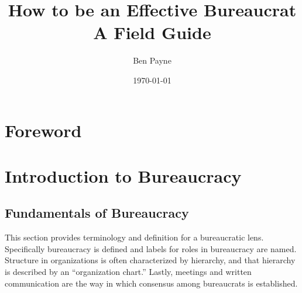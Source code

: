 \documentclass{book}
\title{How to be an Effective Bureaucrat\\
A Field Guide}
\author{Ben Payne}
\date{\today}
\begin{document}

\begin{titlepage}
\maketitle
\thispagestyle{empty}
\end{titlepage}
\newpage

\frontmatter %

\clearpage

\chapter*{Foreword}%

\hypertarget{contents}{}
\tableofcontents

\mainmatter %


\chapter{Introduction to Bureaucracy}

  \newpage %
  
  \section{Fundamentals of Bureaucracy\label{fundamentals_of_b}}
  
  This section provides terminology and definition for a bureaucratic lens. Specifically bureaucracy is defined and labels for roles in bureaucracy are named. Structure in organizations is often characterized by hierarchy, and that hierarchy is described by an ``organization chart.'' Lastly, meetings and written communication are the way in which consensus among bureaucrats is established.

    
    
    
    
    
  \newpage
  \newpage %
\end{document}
